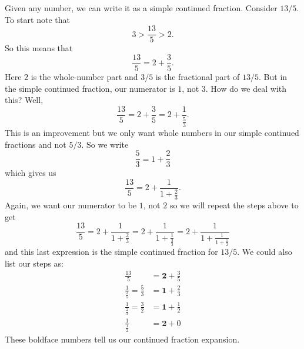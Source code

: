 Given any number, we can write it as a simple continued
fraction. Consider $13/5$. To start note that
\[
3>\frac{13}{5}>2. 
\]
So this means that 
\[
\frac{13}{5}=2 + \frac{3}{5}.
\]
Here $2$ is the whole-number part and $3/5$ is the fractional part of
$13/5$. But in the simple continued fraction, our numerator is $1$,
not $3$. How do we deal with this? Well,
\[
\frac{13}{5}=2+\frac{3}{5}=2+\frac{1}{ \frac{5}{3}}.
\]
This is an improvement but we only want whole numbers in our simple
continued fractions and not $5/3$. So we write
\[
\frac{5}{3}=1+\frac{2}{3}
\]
which gives us
\[
\frac{13}{5}=2+\frac{1}{\displaystyle 1+\frac{2}{3}}.
\]
Again, we want our numerator to be $1$, not $2$ so we will repeat the steps above to get
\[
\frac{13}{5}=2+\frac{1}{\displaystyle 1+\frac{2}{3}}=2+\frac{1}{\displaystyle 1+ \frac{1}{\frac{3}{2}}} 
=2+\frac{1}{\displaystyle 1+\frac{1}{\displaystyle 1+\frac{1}{2}}}
\]
and this last expression is the simple continued fraction for $13/5$. 
We could also list our steps as:
\begin{align*}
\frac{13}{5} & = \mathbf 2 +\frac{3}{5} \\
\frac{1}{\frac{3}{5}}  = \frac{5}{3} & = \mathbf 1 + \frac{2}{3} \\
\frac{1}{\frac{2}{3}}  = \frac{3}{2} & = \mathbf 1 + \frac{1}{2} \\
\frac{1}{\frac{1}{2}} & = \mathbf 2 +0
\end{align*}
These boldface numbers tell us our continued fraction expansion.

